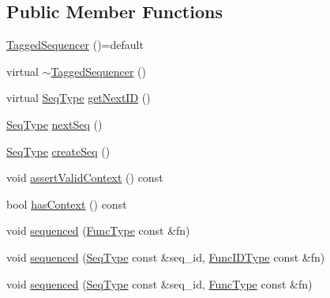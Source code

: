 \subsection*{Public Member Functions}
\begin{DoxyCompactItemize}
\item 
\hyperlink{structvt_1_1seq_1_1_tagged_sequencer_aef74e4a510da24c2305b0d7097684a27}{Tagged\+Sequencer} ()=default
\item 
virtual \hyperlink{structvt_1_1seq_1_1_tagged_sequencer_aceb5a6bcf3915be2cc5d046c6b789af2}{$\sim$\+Tagged\+Sequencer} ()
\item 
virtual \hyperlink{structvt_1_1seq_1_1_tagged_sequencer_a1c8ee839258d0f88c49ef660267a81d5}{Seq\+Type} \hyperlink{structvt_1_1seq_1_1_tagged_sequencer_a243149e1efcc57ae08fb265b09ef9a60}{get\+Next\+ID} ()
\item 
\hyperlink{structvt_1_1seq_1_1_tagged_sequencer_a1c8ee839258d0f88c49ef660267a81d5}{Seq\+Type} \hyperlink{structvt_1_1seq_1_1_tagged_sequencer_af7a02a262d3da7958b24b7d7997df9f1}{next\+Seq} ()
\item 
\hyperlink{structvt_1_1seq_1_1_tagged_sequencer_a1c8ee839258d0f88c49ef660267a81d5}{Seq\+Type} \hyperlink{structvt_1_1seq_1_1_tagged_sequencer_a40e2409864dd545725218f4a8784fa94}{create\+Seq} ()
\item 
void \hyperlink{structvt_1_1seq_1_1_tagged_sequencer_ad611e5f85e87bcd6fb56058bacc64fa3}{assert\+Valid\+Context} () const
\item 
bool \hyperlink{structvt_1_1seq_1_1_tagged_sequencer_a5b09f5b9a741dc336f7e5b63223d2ef2}{has\+Context} () const
\item 
void \hyperlink{structvt_1_1seq_1_1_tagged_sequencer_aaef2d117b759bccdd9007f339c386a8e}{sequenced} (\hyperlink{namespacevt_1_1seq_a26c632e5cbf02395a8bbd9aa4c761232}{Func\+Type} const \&fn)
\item 
void \hyperlink{structvt_1_1seq_1_1_tagged_sequencer_a1250aeac9be57bb09addc44323f80e6f}{sequenced} (\hyperlink{structvt_1_1seq_1_1_tagged_sequencer_a1c8ee839258d0f88c49ef660267a81d5}{Seq\+Type} const \&seq\+\_\+id, \hyperlink{namespacevt_1_1seq_a228aa2c36a3564f50232a32a8b4ff866}{Func\+I\+D\+Type} const \&fn)
\item 
void \hyperlink{structvt_1_1seq_1_1_tagged_sequencer_ade6a701fdb88aadfb792fb5a5f4ecb3b}{sequenced} (\hyperlink{structvt_1_1seq_1_1_tagged_sequencer_a1c8ee839258d0f88c49ef660267a81d5}{Seq\+Type} const \&seq\+\_\+id, \hyperlink{namespacevt_1_1seq_a26c632e5cbf02395a8bbd9aa4c761232}{Func\+Type} const \&fn)
\item 

\end{DoxyCompactItemize}
